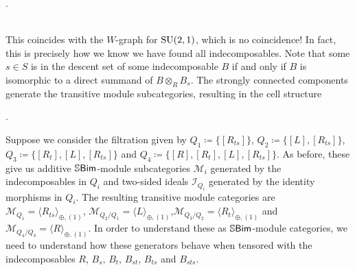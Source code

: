 \begin{example}
\begin{center}
\begin{tikzcd}[labels={outer sep=-0.75cm}, nodes={circle, minimum size=2cm, inner sep=0cm, outer sep=-0.5cm}, cramped, column sep=-0.25cm, row sep=-0.25cm]
\end{tikzcd}.
\end{center}
\noindent\\[-4.5\linespacing] This coincides with the $W$-graph for $\textup{SU}(2, 1)$, which is no coincidence! In fact, this is precisely how we know we have found all indecomposables. Note that some $s \in S$ is in the descent set of some indecomposable $B$ if and only if $B$ is isomorphic to a direct summand of $B \otimes_R B_s$. The strongly connected components generate the transitive module subcategories, resulting in the cell structure
\begin{center}
.
\end{center}
\noindent Suppose we consider the filtration given by $Q_1 \coloneqq \{[R_{ts}]\}$, $Q_2 \coloneqq \{[L], [R_{ts}]\}$, $Q_3 \coloneqq \{[R_t], [L], [R_{ts}]\}$ and $Q_4 \coloneqq \{[R], [R_t], [L], [R_{ts}]\}$. As before, these give us additive $\mathbb{S}\textcat{Bim}$-module subcategories $\mathcal{M}_i$ generated by the indecomposables in $Q_i$ and two-sided ideals $\mathcal{I}_{Q_i}$ generated by the identity morphisms in $Q_i$. The resulting transitive module categories are $\mathcal{M}_{Q_1} = \langle R_{ts} \rangle_{\oplus,(1)}$, $\mathcal{M}_{Q_2/Q_1} = \langle L\rangle_{\oplus,(1)}$,\linebreak $\mathcal{M}_{Q_3/Q_2} = \langle R_t \rangle_{\oplus,(1)}$ and $\mathcal{M}_{Q_4/Q_3} = \langle R \rangle_{\oplus,(1)}$. In order to understand these as $\mathbb{S}\textcat{Bim}$-module categories, we need to understand how these generators behave when tensored with the indecomposables $R$, $B_s$, $B_t$, $B_{st}$, $B_{ts}$ and $B_{sts}$.\\ %
\end{example}
\newpage

